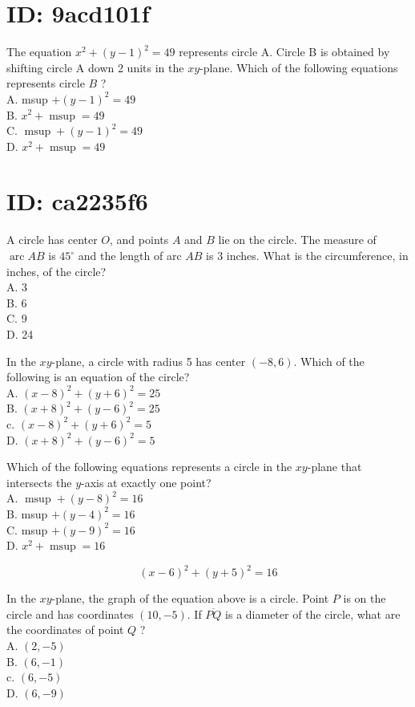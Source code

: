 \section*{ID: 9acd101f}
The equation $x^{2}+(y-1)^{2}=49$ represents circle A. Circle B is obtained by shifting circle A down 2 units in the $x y$-plane. Which of the following equations represents circle $B$ ?\\
A. msup $+(y-1)^{2}=49$\\
B. $x^{2}+\operatorname{msup}=49$\\
C. $\operatorname{msup}+(y-1)^{2}=49$\\
D. $x^{2}+\operatorname{msup}=49$

\section*{ID: ca2235f6}
A circle has center $O$, and points $A$ and $B$ lie on the circle. The measure of $\operatorname{arc} A B$ is $45^{\circ}$ and the length of arc $A B$ is 3 inches. What is the circumference, in inches, of the circle?\\
A. 3\\
B. 6\\
C. 9\\
D. 24

In the $x y$-plane, a circle with radius 5 has center $(-8,6)$. Which of the following is an equation of the circle?\\
A. $(x-8)^{2}+(y+6)^{2}=25$\\
B. $(x+8)^{2}+(y-6)^{2}=25$\\
c. $(x-8)^{2}+(y+6)^{2}=5$\\
D. $(x+8)^{2}+(y-6)^{2}=5$

Which of the following equations represents a circle in the $x y$-plane that intersects the $y$-axis at exactly one point?\\
A. $\operatorname{msup}+(y-8)^{2}=16$\\
B. msup $+(y-4)^{2}=16$\\
C. msup $+(y-9)^{2}=16$\\
D. $x^{2}+\operatorname{msup}=16$

$$
(x-6)^{2}+(y+5)^{2}=16
$$

In the $x y$-plane, the graph of the equation above is a circle. Point $P$ is on the circle and has coordinates $(10,-5)$. If $\overline{P Q}$ is a diameter of the circle, what are the coordinates of point $Q$ ?\\
A. $(2,-5)$\\
B. $(6,-1)$\\
c. $(6,-5)$\\
D. $(6,-9)$

